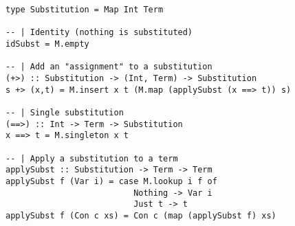 \documentclass{article}
\newcommand{\answer}[1]{}
\begin{document}
\begin{verbatim}
type Substitution = Map Int Term

-- | Identity (nothing is substituted)
idSubst = M.empty

-- | Add an "assignment" to a substitution
(+>) :: Substitution -> (Int, Term) -> Substitution
s +> (x,t) = M.insert x t (M.map (applySubst (x ==> t)) s)

-- | Single substitution
(==>) :: Int -> Term -> Substitution
x ==> t = M.singleton x t

-- | Apply a substitution to a term
applySubst :: Substitution -> Term -> Term
applySubst f (Var i) = case M.lookup i f of
                          Nothing -> Var i
                          Just t -> t
applySubst f (Con c xs) = Con c (map (applySubst f) xs)
\end{verbatim}

\answer{
  \begin{itemize}
  \item The errors are in lines 4 and 7.
  \item 4. One needs to check equality of f and g
        7. One must add the occurs check.
  \item if (x `elems` varsOf t) then Nothing else ...
  \end{itemize}
}
\end{document}
